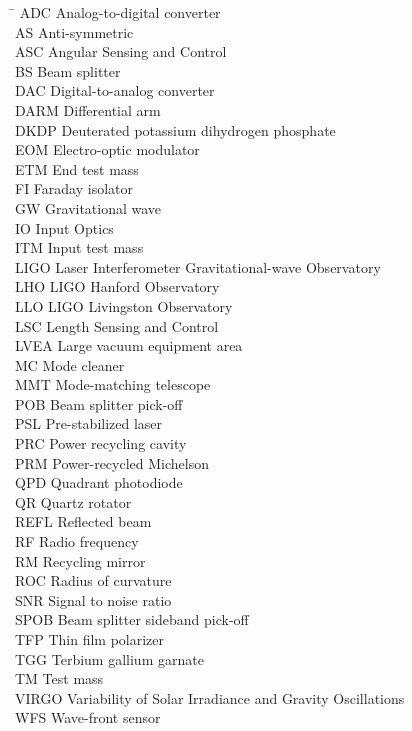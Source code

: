 \begin{tabbing}
\hspace{1in} \= \kill
ADC \> Analog-to-digital converter \\
AS \> Anti-symmetric \\
ASC \> Angular Sensing and Control \\
BS \> Beam splitter \\
DAC \> Digital-to-analog converter\\
DARM \> Differential arm \\
DKDP \> Deuterated potassium dihydrogen phosphate \\
EOM \> Electro-optic modulator \\
ETM \> End test mass \\
FI \> Faraday isolator \\
GW \> Gravitational wave \\
IO \> Input Optics \\
ITM \> Input test mass \\
LIGO \> Laser Interferometer Gravitational-wave Observatory \\
LHO \> LIGO Hanford Observatory \\
LLO \> LIGO Livingston Observatory \\
LSC \> Length Sensing and Control \\
LVEA \> Large vacuum equipment area \\
MC \> Mode cleaner \\
MMT \> Mode-matching telescope \\
POB \> Beam splitter pick-off \\
PSL \> Pre-stabilized laser \\
PRC \> Power recycling cavity \\
PRM \> Power-recycled Michelson \\
QPD \> Quadrant photodiode \\
QR \> Quartz rotator \\
REFL \> Reflected beam \\
RF \> Radio frequency \\
RM \> Recycling mirror \\
ROC \> Radius of curvature \\
SNR \> Signal to noise ratio \\
SPOB \> Beam splitter sideband pick-off \\
TFP \> Thin film polarizer \\
TGG \> Terbium gallium garnate \\
TM \> Test mass \\
VIRGO \> Variability of Solar Irradiance and Gravity Oscillations \\
WFS \> Wave-front sensor 
\end{tabbing}
